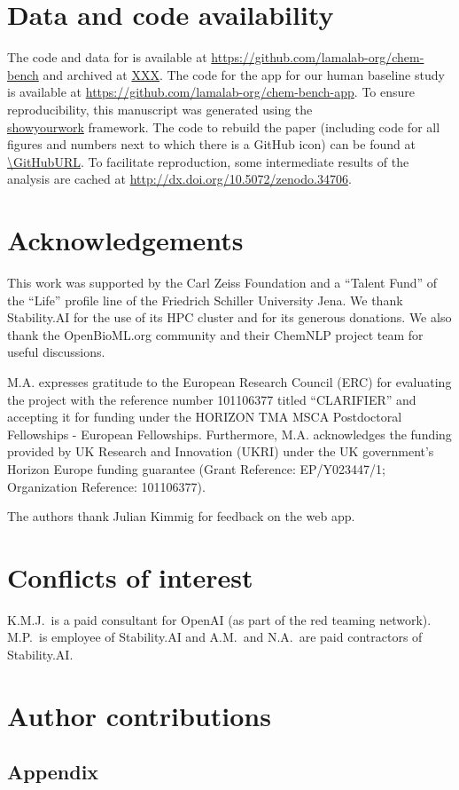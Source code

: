 \documentclass[11pt, oneside]{article}
\begin{document}
\begin{refsection}
\section*{Data and code availability}
The code and data for \chembench is available at \url{https://github.com/lamalab-org/chem-bench} and archived at \url{XXX}.
The code for the app for our human baseline study is available at \url{https://github.com/lamalab-org/chem-bench-app}. 
To ensure reproducibility, this manuscript was generated using the \href{https://show-your.work/en/latest/}{\\showyourwork} framework.\autocite{Luger2021}
The code to rebuild the paper (including code for all figures and numbers next to which there is a GitHub icon) can be found at \url{\GitHubURL}. 
To facilitate reproduction, some intermediate results of the analysis are cached at \url{http://dx.doi.org/10.5072/zenodo.34706}.

\section*{Acknowledgements}
This work was supported by the Carl Zeiss Foundation and a \enquote{Talent Fund} of the \enquote{Life} profile line of the Friedrich Schiller University Jena.
We thank Stability.AI for the use of its HPC cluster and for its generous donations.
We also thank the OpenBioML.org community and their ChemNLP project team for useful discussions.

M.A. expresses gratitude to the European Research Council (ERC) for evaluating the project with the reference number 101106377 titled \enquote{CLARIFIER} and accepting it for funding under the HORIZON TMA MSCA Postdoctoral Fellowships - European Fellowships. 
Furthermore, M.A. acknowledges the funding provided by UK Research and Innovation (UKRI) under the UK government’s Horizon Europe funding guarantee (Grant Reference: EP/Y023447/1; Organization Reference: 101106377).

The authors thank Julian Kimmig for feedback on the web app. 

\section*{Conflicts of interest}
K.M.J.\ is a paid consultant for OpenAI (as part of the red teaming network). M.P.\ is employee of Stability.AI and A.M.\ and N.A.\ are paid contractors of Stability.AI.

\section*{Author contributions}

\scriptsize
\insertcredits
\normalsize
\printbibliography
\end{refsection}


\clearpage
\begin{refsection}
\appendix
\section{Appendix}

\clearpage
\printbibliography[heading=subbibintoc]
\end{refsection}
\end{document}
